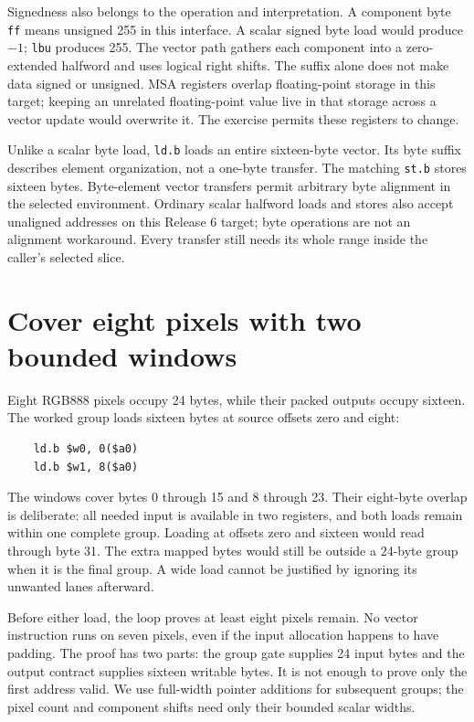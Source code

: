 Signedness also belongs to the operation and interpretation. A component byte
\texttt{ff} means unsigned 255 in this interface. A scalar signed byte load would
produce $-1$; \texttt{lbu} produces 255. The vector path gathers each component into
a zero-extended halfword and uses logical right shifts. The suffix alone does not
make data signed or unsigned. MSA registers overlap floating-point storage in this
target; keeping an unrelated floating-point value live in that storage across a
vector update would overwrite it. The exercise permits these registers to change.

Unlike a scalar byte load, \texttt{ld.b} loads an entire sixteen-byte vector.
Its byte suffix describes element organization, not a one-byte transfer. The
matching \texttt{st.b} stores sixteen bytes. Byte-element vector transfers permit
arbitrary byte alignment in the selected environment. Ordinary scalar halfword
loads and stores also accept unaligned addresses on this Release 6 target; byte
operations are not an alignment workaround. Every transfer still needs its whole
range inside the caller's selected slice.

\section{Cover eight pixels with two bounded windows}

Eight RGB888 pixels occupy 24 bytes, while their packed outputs occupy sixteen.
The worked group loads sixteen bytes at source offsets zero and eight:
\begin{verbatim}
    ld.b $w0, 0($a0)
    ld.b $w1, 8($a0)
\end{verbatim}
The windows cover bytes 0 through 15 and 8 through 23. Their eight-byte overlap
is deliberate: all needed input is available in two registers, and both loads
remain within one complete group. Loading at offsets zero and sixteen would read
through byte 31. The extra mapped bytes would still be outside a 24-byte group
when it is the final group. A wide load cannot be justified by ignoring its
unwanted lanes afterward.

Before either load, the loop proves at least eight pixels remain. No vector
instruction runs on seven pixels, even if the input allocation happens to have
padding. The proof has two parts: the group gate supplies 24 input bytes and the
output contract supplies sixteen writable bytes. It is not enough to prove only
the first address valid. We use full-width pointer additions for subsequent groups;
the pixel count and component shifts need only their bounded scalar widths.

